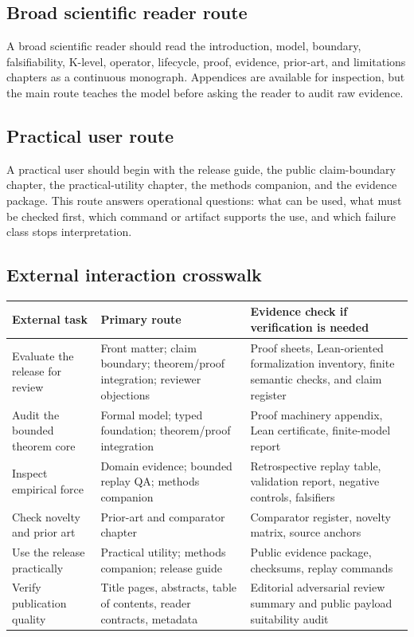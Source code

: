 \subsection{Broad scientific reader route}

A broad scientific reader should read the introduction, model, boundary,
falsifiability, K-level, operator, lifecycle, proof, evidence, prior-art, and
limitations chapters as a continuous monograph. Appendices are available for
inspection, but the main route teaches the model before asking the reader to
audit raw evidence.

\subsection{Practical user route}

A practical user should begin with the release guide, the public claim-boundary
chapter, the practical-utility chapter, the methods companion, and the evidence
package. This route answers operational questions: what can be used, what must
be checked first, which command or artifact supports the use, and which failure
class stops interpretation.

\subsection{External interaction crosswalk}

\begin{longtable}{p{}p{}p{}}
\textbf{External task} & \textbf{Primary route} & \textbf{Evidence check if verification is needed} \\
\hline
Evaluate the release for review & Front matter; claim boundary; theorem/proof integration; reviewer objections & Proof sheets, Lean-oriented formalization inventory, finite semantic checks, and claim register \\
Audit the bounded theorem core & Formal model; typed foundation; theorem/proof integration & Proof machinery appendix, Lean certificate, finite-model report \\
Inspect empirical force & Domain evidence; bounded replay QA; methods companion & Retrospective replay table, validation report, negative controls, falsifiers \\
Check novelty and prior art & Prior-art and comparator chapter & Comparator register, novelty matrix, source anchors \\
Use the release practically & Practical utility; methods companion; release guide & Public evidence package, checksums, replay commands \\
Verify publication quality & Title pages, abstracts, table of contents, reader contracts, metadata & Editorial adversarial review summary and public payload suitability audit \\
\end{longtable}

